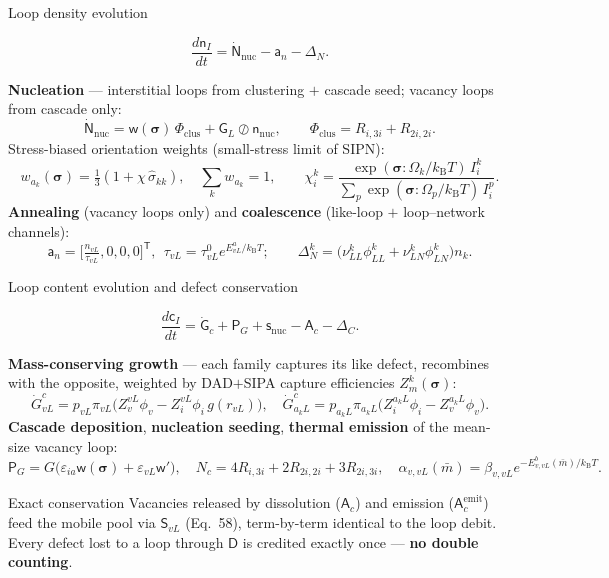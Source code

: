 \documentclass[aspectratio=169,10pt]{beamer}
\newcommand{\sa}[1]{\bm{\mathsf{#1}}}
\newcommand{\ca}[1]{\bm{#1}}
\newcommand{\kB}{k_{\mathrm B}}
\begin{document}
\begin{frame}{Loop density evolution}
\begin{block}{}
\[
\frac{d\sa{n}_I}{dt}=\dot{\sa{N}}_{\mathrm{nuc}}-\sa{a}_n-\sa{\Delta}_N .\tag{35}
\]
\end{block}
\small
\textbf{Nucleation} — interstitial loops from clustering $+$ cascade seed; vacancy loops from cascade only:
\[
\dot{\sa{N}}_{\mathrm{nuc}}=\sa{w}(\ca{\sigma})\,\Phi_{\mathrm{clus}}+\sa{G}_L\oslash\sa{n}_{\mathrm{nuc}},
\qquad \Phi_{\mathrm{clus}}=R_{i,3i}+R_{2i,2i}.\tag{37}
\]
Stress-biased orientation weights (small-stress limit of SIPN):
\[
w_{a_k}(\ca{\sigma})=\tfrac13(1+\chi\,\hat\sigma_{kk}),\quad \textstyle\sum_k w_{a_k}=1,\qquad
\chi^k_i=\frac{\exp(\ca{\sigma}:\Omega_k/\kB T)\,I^k_i}{\sum_p \exp(\ca{\sigma}:\Omega_p/\kB T)\,I^p_i}.\tag{38}
\]
\vfill
\textbf{Annealing} (vacancy loops only) and \textbf{coalescence} (like-loop $+$ loop--network channels):
\[
\sa{a}_n=\Big[\tfrac{n_{vL}}{\tau_{vL}},0,0,0\Big]^{\mathsf T},\ \
\tau_{vL}=\tau^0_{vL}e^{E^a_{vL}/\kB T};\qquad
\Delta_N^k=\big(\nu^k_{LL}\phi^k_{LL}+\nu^k_{LN}\phi^k_{LN}\big)n_k.\tag{36,39}
\]
\end{frame}

\begin{frame}{Loop content evolution and defect conservation}
\begin{block}{}
\[
\frac{d\sa{c}_I}{dt}=\dot{\sa{G}}_c+\sa{P}_G+\sa{s}_{\mathrm{nuc}}-\sa{A}_c-\sa{\Delta}_C .\tag{40}
\]
\end{block}
\small
\textbf{Mass-conserving growth} — each family captures its like defect, recombines with the opposite,
weighted by DAD$+$SIPA capture efficiencies $Z^{k}_m(\ca{\sigma})$:
\[
\dot G^c_{vL}=p_{vL}\pi_{vL}\big(Z^{vL}_v\phi_v-Z^{vL}_i\phi_i\,g(r_{vL})\big),\quad
\dot G^c_{a_kL}=p_{a_kL}\pi_{a_kL}\big(Z^{a_kL}_i\phi_i-Z^{a_kL}_v\phi_v\big).\tag{43--51}
\]
\textbf{Cascade deposition}, \textbf{nucleation seeding}, \textbf{thermal emission} of the mean-size vacancy loop:
\[
\sa{P}_G=G\big(\varepsilon_{ia}\sa{w}(\ca{\sigma})+\varepsilon_{vL}\sa{w}'\big),\quad
N_c=4R_{i,3i}+2R_{2i,2i}+3R_{2i,3i},\quad
\alpha_{v,vL}(\bar m)=\beta_{v,vL}e^{-E^b_{v,vL}(\bar m)/\kB T}.\tag{52,53,56}
\]
\vfill
\begin{block}{Exact conservation}
\footnotesize
Vacancies released by dissolution ($\sa{A}_c$) and emission ($\sa{A}^{\mathrm{emit}}_c$) feed the mobile pool
via $\sa{S}_{vL}$ (Eq.~58), term-by-term identical to the loop debit. Every defect lost to a loop through
$\sa{D}$ is credited exactly once — \textbf{no double counting}.
\end{block}
\end{frame}
\end{document}
